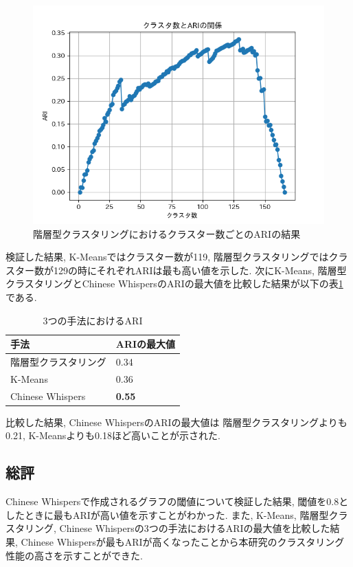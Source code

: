 \begin{figure}[H]
  \centering
  \includegraphics[scale=0.8]
    {contents/images/agg_graph.png}
  \caption{階層型クラスタリングにおけるクラスター数ごとのARIの結果\label{fig:agg_graph}}
\end{figure}

検証した結果, K-Meansではクラスター数が119, 階層型クラスタリングではクラスター数が129の時にそれぞれARIは最も高い値を示した. 次にK-Means, 階層型クラスタリングとChinese WhispersのARIの最大値を比較した結果が以下の表\ref{tb:two_ari}である. 

\begin{table}[H]
  \caption{3つの手法におけるARI}
  \label{tb:two_ari}
  \begin{center}
  \begin{tabularx}{\linewidth}{X|X}
    \hline
    手法&ARIの最大値\\\hline\hline
    階層型クラスタリング&0.34\\\hline
    K-Means&0.36\\\hline
    Chinese Whispers&\textbf{0.55}\\\hline
  \end{tabularx}\end{center}
\end{table}

比較した結果, Chinese WhispersのARIの最大値は 階層型クラスタリングよりも0.21, K-Meansよりも0.18ほど高いことが示された. 

\subsection{総評}
Chinese Whispersで作成されるグラフの閾値について検証した結果, 閾値を0.8としたときに最もARIが高い値を示すことがわかった. 
また, K-Means, 階層型クラスタリング, Chinese Whispersの3つの手法におけるARIの最大値を比較した結果, Chinese Whispersが最もARIが高くなったことから本研究のクラスタリング性能の高さを示すことができた. 

